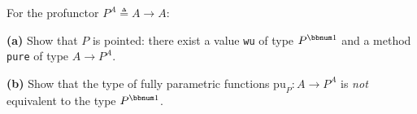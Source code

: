 For the profunctor $P^{A}\triangleq A\rightarrow A$:

\textbf{(a)} Show that $P$ is pointed: there exist a value \lstinline!wu!
of type $P^{\bbnum 1}$ and a method \lstinline!pure! of type $A\rightarrow P^{A}$. 

\textbf{(b)} Show that the type of fully parametric functions $\text{pu}_{P}:A\rightarrow P^{A}$
is \emph{not} equivalent to the type $P^{\bbnum 1}$.

\begin{comment}
this is chapter eight devoted to applicative hunters and pro functors
the first part will be practical examples main motivation for applicati
factors comes from considering kinetic computations or computations
in the factor block as I color in case when effects are independent
and competitive or in case when these effects could be executed in
parallel while the result is still correct here is an example consider
a portion of a functor block or a for yield block in Scala that looks
like this there are three future values and X will be waiting until
with this future value is ready imagine that these are some long-running
computations and after these three lines we can use XYZ and further
computations any further computations will be waiting for these three
futures now if we write code like this then these three futures will
be created sequentially that is first this future will be created
and scheduled on some thread and then when it\textsf{'}s done you get the value
X and then this second future will be created and scheduled even though
it doesn't use the value X but the monadic block or the for yield
block or the Thunder block whatever you want to call it I call it
a factor block the Thunder block is such that every generator line
locks everything else until it\textsf{'}s done so in the future we'll be created
one at a time and so obviously this is not optimal if you translate
this into flat map code and map that\textsf{'}s the code so you have a first
future but to which you append this flat map so you schedule it is
further computation only when the first computation is ready the second
future will be then started and this will be waiting until the second
future is ready and then the third future will be started and this
will be ready will be waiting until the third future is ready clearly
this is not optimal would like to parallelize these things and we
have seen in a previous tutorial that a very easy way of paralyzing
such computations is to create the futures before starting the factor
block but this is actually a specific feature of scholar where futures

\end{comment}
